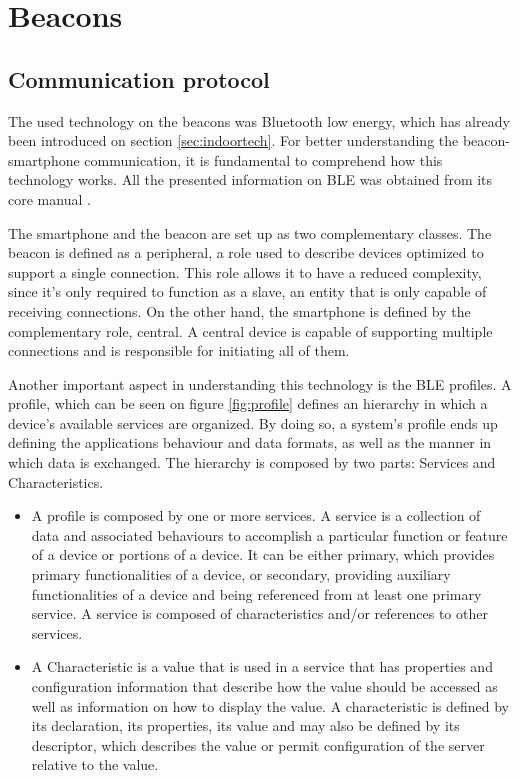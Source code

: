 \section{ Beacons}  
\label{sec:beacon}  
  
  
\subsection{Communication protocol}  
\label{sec:commprot}  
  
  
The used technology on the beacons was Bluetooth low energy, which has already been introduced on section \ref{sec:indoortech}. For better understanding the beacon-smartphone communication, it is fundamental to comprehend how this technology works. All the presented information on \ac{BLE} was obtained from its core manual \cite{BLECore}.  
  
 
 
The smartphone and the beacon are set up as two complementary classes. The beacon is defined as a peripheral, a role used to describe devices optimized to support a single connection. This role allows it to have a reduced complexity, since it's only required to function as a slave, an entity that is only capable of receiving connections. On the other hand, the smartphone is defined by the complementary role, central. A central device is capable of supporting multiple connections and is responsible for initiating all of them.  
  
  
 
 
  
  
Another important aspect in understanding this technology is the \ac{BLE} profiles. A profile, which can be seen on figure \ref{fig:profile} defines an hierarchy in which a device's available services are organized. By doing so, a system's profile ends up defining the applications behaviour and data formats, as well as the manner in which data is exchanged. The hierarchy is composed by two parts: Services and Characteristics.  
  
  
\begin{itemize}  
  
  
\item A profile is composed by one or more services. A service is a collection of data and associated behaviours to accomplish a particular function or feature of a device or portions of a device. It can be either primary, which provides primary functionalities of a device, or secondary, providing auxiliary functionalities of a device and being referenced from at least one primary service. A service is composed of characteristics and/or references to other services.  
  
  
\item A Characteristic is a value that is used in a service that has properties and configuration information that describe how the value should be accessed as well as information on how to display the value. A characteristic is defined by its declaration, its properties, its value and may also be defined by its descriptor, which describes the value or permit configuration of  
the server relative to the value.  
\end{itemize}  
  
